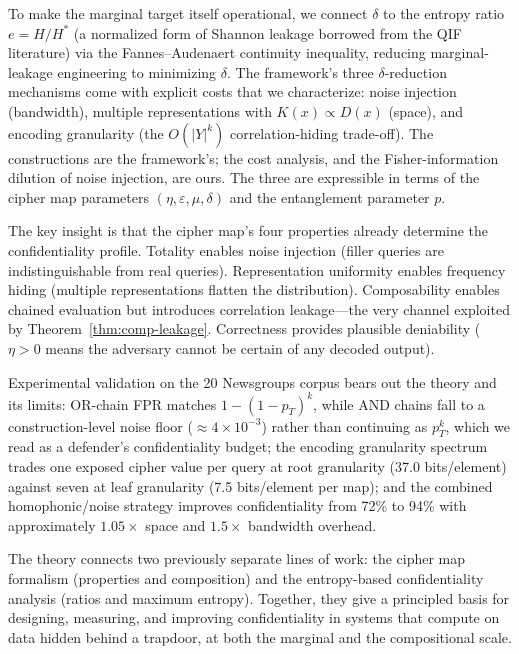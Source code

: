 \documentclass[11pt]{article}
\theoremstyle{definition}
\theoremstyle{plain}
\theoremstyle{remark}
\begin{document}
To make the marginal target itself operational, we connect $\delta$ to
the entropy ratio $e = H/H^*$ (a normalized form of Shannon leakage
borrowed from the QIF literature) via the Fannes--Audenaert continuity
inequality, reducing marginal-leakage engineering to minimizing
$\delta$.  The framework's three $\delta$-reduction mechanisms come
with explicit costs that we characterize: noise injection (bandwidth),
multiple representations with $K(x) \propto D(x)$ (space), and encoding
granularity (the $O(|Y|^k)$ correlation-hiding trade-off).  The
constructions are the framework's; the cost analysis, and the
Fisher-information dilution of noise injection, are ours.  The three
are expressible in terms of the cipher map parameters
$(\eta, \varepsilon, \mu, \delta)$ and the entanglement parameter $p$.

The key insight is that the cipher map's four properties already
determine the confidentiality profile.  Totality enables noise injection
(filler queries are indistinguishable from real queries).  Representation
uniformity enables frequency hiding (multiple representations flatten the
distribution).  Composability enables chained evaluation but introduces
correlation leakage---the very channel exploited by Theorem~\ref{thm:comp-leakage}.
Correctness provides plausible deniability
($\eta > 0$ means the adversary cannot be certain of any decoded output).

Experimental validation on the 20 Newsgroups corpus bears out the theory
and its limits: OR-chain FPR matches $1 - (1 - p_T)^k$, while AND chains
fall to a construction-level noise floor ($\approx 4 \times 10^{-3}$)
rather than continuing as $p_T^k$, which we read as a defender's
confidentiality budget; the encoding granularity spectrum trades one
exposed cipher value per query at root granularity (37.0 bits/element)
against seven at leaf granularity (7.5 bits/element per map); and the
combined homophonic/noise strategy improves confidentiality from 72\% to
94\% with approximately $1.05\times$ space and $1.5\times$ bandwidth
overhead.

The theory connects two previously separate lines of work: the cipher map
formalism (properties and composition) and the entropy-based
confidentiality analysis (ratios and maximum entropy).  Together, they
give a principled basis for designing, measuring, and improving
confidentiality in systems that compute on data hidden behind a trapdoor,
at both the marginal and the compositional scale.




\end{document}
